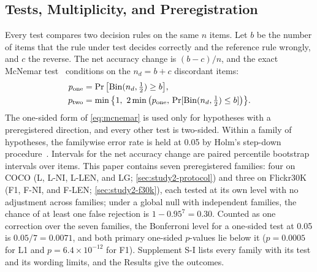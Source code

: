 \subsection{Tests, Multiplicity, and Preregistration}\label{sec:setting-tests}
Every test compares two decision rules on the same $n$ items.
Let $b$ be the number of items that the rule under test decides correctly and the reference rule wrongly, and $c$ the reverse.
The net accuracy change is $(b-c)/n$, and the exact McNemar test~\cite{mcnemar1947} conditions on the $n_d=b+c$ discordant items:
\begin{align}
p_{\rm one}&=\Pr\big[\mathrm{Bin}(n_d,\tfrac12)\ge b\big],\notag\\
p_{\rm two}&=\min\big\{1,\ 2\min\big(p_{\rm one},\,\Pr[\mathrm{Bin}(n_d,\tfrac12)\le b]\big)\big\}.
\label{eq:mcnemar}
\end{align}
The one-sided form of \eqref{eq:mcnemar} is used only for hypotheses with a preregistered direction, and every other test is two-sided.
Within a family of hypotheses, the familywise error rate is held at 0.05 by Holm's step-down procedure~\cite{holm1979sequentially}.
Intervals for the net accuracy change are paired percentile bootstrap intervals over items.
This paper contains seven preregistered families: four on COCO (L, L-NI, L-LEN, and LG; \cref{sec:study2-protocol}) and three on Flickr30K (F1, F-NI, and F-LEN; \cref{sec:study2-f30k}), each tested at its own level with no adjustment across families;
under a global null with independent families, the chance of at least one false rejection is $1-0.95^{7}=0.30$.
Counted as one correction over the seven families, the Bonferroni level for a one-sided test at 0.05 is $0.05/7=0.0071$, and both primary one-sided $p$-values lie below it ($p=0.0005$ for L1 and $p=6.4\times10^{-12}$ for F1).
Supplement S-I lists every family with its test and its wording limits, and the Results give the outcomes.

